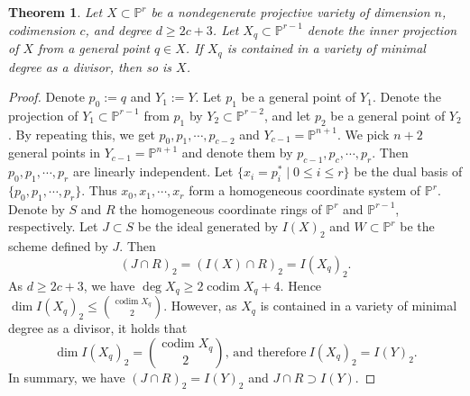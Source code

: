 \documentclass[11pt,letterpaper,reqno]{amsart}
\theoremstyle{plain}
\newtheorem{theorem}{Theorem}[section]
\theoremstyle{definition}
\newtheorem{open problem}[theorem]{Open Problem}
\newtheorem{remark and notation}[theorem]{Remark and Notation}
\newtheorem{remark and definition}[theorem]{Remark and Definition}
\newtheorem{definition and notation}[theorem]{Definition and Notation}
\newtheorem{notation and convention}[theorem]{Notation and Convention}
\newtheorem{notation and remark}[theorem]{Notation and Remark}
\newtheorem{convention and notation}[theorem]{Convention and Notation}
\def \p {\mathbb{P}}
\def \codim {\operatorname{codim}}
\begin{document}
\begin{theorem}\label{lp_2c+3}
    Let $X\subset\p^r$ be a nondegenerate projective variety of dimension $n$, codimension $c$, and degree $d\geq 2c+3$. 
    Let $X_q\subset\p^{r-1}$ denote the inner projection of $X$ from a general point $q\in X$.
    If $X_q$ is contained in a variety of minimal degree as a divisor, then so is $X$.
\end{theorem}
\begin{proof}
    Denote $p_0:=q$ and $Y_1:=Y$.
    Let $p_1$ be a general point of $Y_1$.
    Denote the projection of $Y_1\subset\p^{r-1}$ from $p_1$ by $Y_2\subset\p^{r-2}$, and let $p_2$ be a general point of $Y_2$.
    By repeating this, we get $p_0,p_1,\cdots,p_{c-2}$ and $Y_{c-1}=\p^{n+1}$.
    We pick $n+2$ general points in $Y_{c-1}=\p^{n+1}$ and denote them by $p_{c-1},p_c,\cdots,p_r$.
    Then $p_0,p_1,\cdots,p_r$ are linearly independent.
    Let $\{x_i = p_i^* \mid 0 \leq i \leq r \}$ be the dual basis of $\{p_0,p_1,\cdots,p_r\}$.
    Thus $x_0,x_1,\cdots, x_r$ form a homogeneous coordinate system of $\p^r$.
    Denote by $S$ and $R$ the homogeneous coordinate rings of $\p^r$ and $\p^{r-1}$, respectively.
    Let $J\subset S$ be the ideal generated by $I(X)_2$ and $W\subset\p^r$ be the scheme defined by $J$.
    Then $$(J\cap R)_2=(I(X)\cap R)_2=I(X_q)_2.$$
    As $d\geq 2c+3$, we have $\deg X_q\geq 2\codim X_q+4$. 
    Hence $\dim I(X_q)_2\leq \binom{\codim X_q}{2}$. 
    However, as $X_q$ is contained in a variety of minimal degree as a divisor, it holds that 
    $$\dim I(X_q)_2=\binom{\codim X_q}{2}\text{, and therefore}~ I(X_q)_2=I(Y)_2.$$
    In summary, we have $(J\cap R)_2=I(Y)_2$ and $J\cap R\supset I(Y)$.
    

\end{proof}
\end{document}
